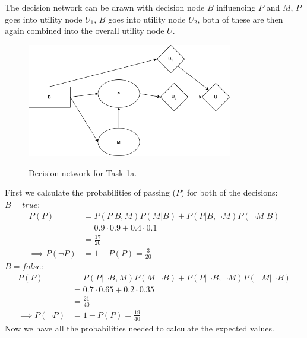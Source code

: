 \documentclass[11pt, a4paper, english]{../Template/NTNUoving}
\begin{document}
\begin{oppgave}

    \begin{punkt}
        The decision network can be drawn with decision node $B$ influencing
        $P$ and $M$, $P$ goes into utility node $U_1$, $B$ goes into utility node $U_2$,
        both of these are then again combined into the overall utility node $U$.

        \begin{figure}[H]
            \centering
            \includegraphics[width=0.8\textwidth]{Task3_1.png}
            \label{fig:1}
            \caption{Decision network for Task 1a.}
        \end{figure}
    \end{punkt}

    \begin{punkt}

        First we calculate the probabilities of passing ($P$) for both of the decisions:
        $B=true$:
        \begin{align*}
            P(P) &= P(P|B,M)P(M|B) + P(P|B,\neg M)P(\neg M|B) \\
            &= 0.9\cdot0.9 + 0.4\cdot0.1 \\
            &= \frac{17}{20} \\
            \implies P(\neg P) &= 1-P(P) = \frac{3}{20}
        \end{align*}
        $B=false$:
        \begin{align*}
            P(P) &= P(P|\neg B,M)P(M|\neg B) + P(P|\neg B,\neg M)P(\neg M| \neg B) \\
            &= 0.7\cdot0.65 + 0.2\cdot0.35 \\
            &= \frac{21}{40} \\
            \implies P(\neg P) &= 1-P(P) = \frac{19}{40}
        \end{align*}
        Now we have all the probabilities needed to calculate the expected values.


\end{punkt}
\end{oppgave}
\end{document}

